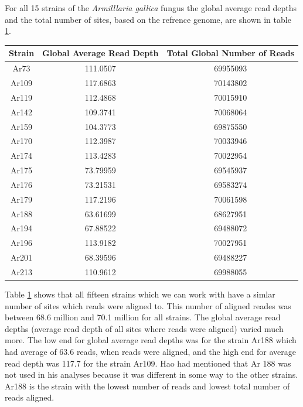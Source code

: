 \documentclass[../main.tex]{subfiles}
\begin{document}
%
%

For all 15 strains of the \textit{Armilllaria gallica} fungus the global average read depths and the total number of sites, based on the refrence genome, are shown in table \ref{tab:avg_rd}. 

\begin{table}[H]
\begin{center}
	 \label{tab:avg_rd}
\begin{tabular}{ |c|c|c| }
		\hline
		Strain & Global Average Read Depth & Total Global Number of Reads \\
		\hline
		Ar73 & 111.0507 & 69955093\\
		\hline
		Ar109 & 117.6863 & 70143802\\
		\hline
		Ar119 & 112.4868 & 70015910\\
		\hline
		Ar142 & 109.3741 & 70068064\\
		\hline
		Ar159 & 104.3773 & 69875550\\
		\hline
		Ar170 & 112.3987 & 70033946\\
		\hline
		Ar174 & 113.4283 & 70022954\\
		\hline
		Ar175 & 73.79959 & 69545937\\
		\hline
		Ar176 & 73.21531 & 69583274\\
		\hline
		Ar179 & 117.2196 & 70061598\\
		\hline
		Ar188 & 63.61699 & 68627951\\
		\hline
		Ar194 & 67.88522 & 69488072\\
		\hline
		Ar196 & 113.9182 & 70027951\\
		\hline
		Ar201 & 68.39596 & 69488227\\
		\hline
		Ar213 & 110.9612 & 69988055\\
		\hline
\end{tabular}
\end{center}
\end{table}

Table \ref{tab:avg_rd} shows that all fifteen strains which we can work with have a simlar number of sites which reads were aligned to. This number of aligned reades was between 68.6 million and 70.1 million for all strains. The global average read depths (average read depth of all sites where reads were aligned) varied much more. The low end for global average read depths was for the strain Ar188 which had average of 63.6 reads, when reads were aligned, and the high end for average read depth was 117.7 for the strain Ar109. Hao had mentioned that Ar 188 was not used in his analyses because it was different in some way to the other strains. Ar188 is the strain with the lowest number of reads and lowest total number of reads aligned.
\end{document}
